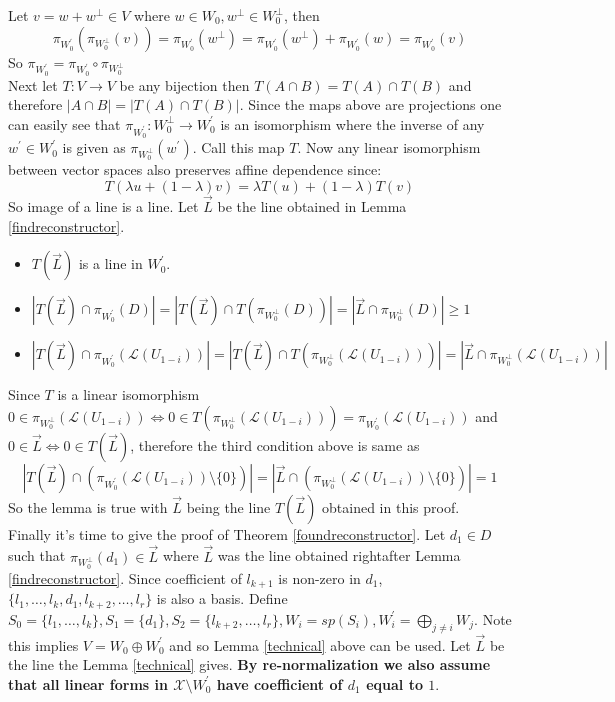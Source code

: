 \documentclass[letterpaper,USenglish,numberwithinsect]{lipics}
\newcommand{\ML}{\mathcal{L}}
\newcommand{\MX}{\mathcal{X}}
\begin{document}
Let $v = w + w^\perp \in V$ where
$w\in W_0, w^\perp \in W_0^\perp$, then
\[
\pi_{W_0^\prime}(\pi_{W_0^\perp}(v)) =
\pi_{W_0^\prime}(w^\perp) = \pi_{W_0^\prime}(w^\perp) + \pi_{W_0^\prime}(w)
=\pi_{W_0^\prime}(v)
\]
So $\pi_{W_0^\prime} = \pi_{W_0^\prime} \circ \pi_{W_0^\perp}$\\

Next let $T : V \rightarrow V$ be any bijection then $T(A\cap B) = T(A) \cap T(B)$ and therefore
$|A\cap B| = |T(A)\cap T(B)|$. Since the maps above are projections one can easily see that
$\pi_{W_0^\prime} : W_0^\perp \rightarrow W_0^\prime$
is an isomorphism where the inverse of any $w^\prime \in W_0^\prime$ is given as $\pi_{W_0^\perp}(w^\prime)$.
Call this map $T$. Now any
linear isomorphism between vector spaces also preserves affine dependence since:
\[
 T(\lambda u + (1-\lambda) v) = \lambda T(u) + (1-\lambda) T(v)
\]
So image of a line is a line. Let $\vec L$ be the line obtained in Lemma \ref{findreconstructor}.
\begin{itemize}
 \item $T(\vec L)$ is a line in $W_0^\prime$.
 \item $|T(\vec L) \cap \pi_{W_0^\prime}({D})| = |T(\vec L) \cap T(\pi_{W_0^\perp}({D}))| = |\vec{L} \cap \pi_{W_0^\perp}({D})| \geq 1$
 \item $ |T(\vec L) \cap \pi_{W_0^\prime}({\ML(U_{1-i})})| = |T(\vec L) \cap T(\pi_{W_0^\perp}({\ML(U_{1-i})}))| = |\vec L \cap \pi_{W_0^\perp}({\ML(U_{1-i})})|$
\end{itemize}
Since $T$ is a linear isomorphism
$0 \in \pi_{W_0^\perp}({\ML(U_{1-i})}) \Leftrightarrow 0 \in T(\pi_{W_0^\perp}({\ML(U_{1-i})})) = \pi_{W_0^\prime}({\ML(U_{1-i})})$ and
$0\in \vec L \Leftrightarrow 0\in T(\vec L)$, therefore
the third condition above is same as
\[
|T(\vec L) \cap (\pi_{W_0^\prime}({\ML(U_{1-i})})\setminus \{0\})| =
|\vec L \cap (\pi_{W_0^\perp}({\ML(U_{1-i})})\setminus \{0\})| =1
\]
So the lemma is true with $\vec L$ being the line $T(\vec L)$ obtained in this proof. \\


Finally it's time to give the proof of Theorem \ref{foundreconstructor}. Let $d_1\in D$ such that
$\pi_{W_0^\perp}(d_1) \in \vec L$ where $\vec L$ was the line obtained rightafter Lemma \ref{findreconstructor}.
Since coefficient of $l_{k+1}$ is non-zero in $d_1$, $\{l_1,\ldots,l_k,d_1,l_{k+2},\ldots,l_r\}$ is also a basis. Define
$S_0=\{l_1,\ldots,l_k\}, S_1 = \{d_1\}, S_2 = \{l_{k+2},\ldots,l_r\}, W_i = sp(S_i), W_i^\prime = \bigoplus\limits_{j\neq i}
W_j$. Note this implies $V = W_0 \oplus W_0^\prime$ and so Lemma \ref{technical} above can be used. Let $\vec L$
be the line the Lemma \ref{technical} gives. {\bf By re-normalization we also assume that all linear forms in $
\MX \setminus W_0^\prime$ have coefficient of $d_1$ equal to $1$}.\\
\end{document}
